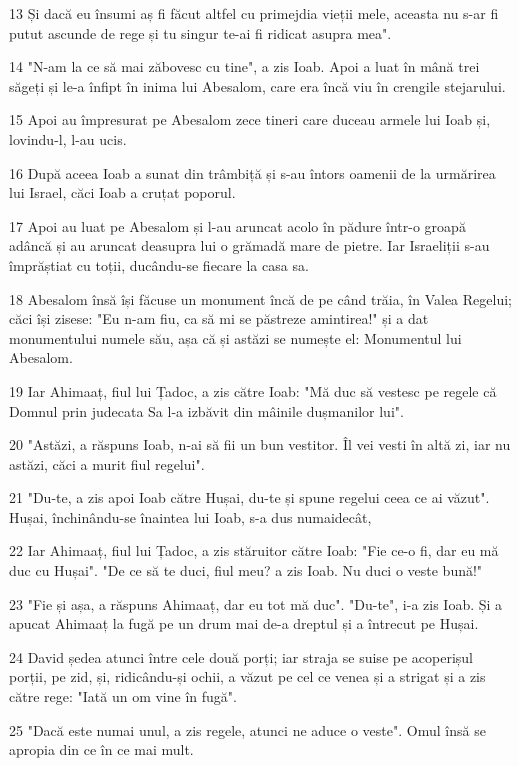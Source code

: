 \par 13 Și dacă eu însumi aș fi făcut altfel cu primejdia vieții mele, aceasta nu s-ar fi putut ascunde de rege și tu singur te-ai fi ridicat asupra mea".
\par 14 "N-am la ce să mai zăbovesc cu tine", a zis Ioab. Apoi a luat în mână trei săgeți și le-a înfipt în inima lui Abesalom, care era încă viu în crengile stejarului.
\par 15 Apoi au împresurat pe Abesalom zece tineri care duceau armele lui Ioab și, lovindu-l, l-au ucis.
\par 16 După aceea Ioab a sunat din trâmbiță și s-au întors oamenii de la urmărirea lui Israel, căci Ioab a cruțat poporul.
\par 17 Apoi au luat pe Abesalom și l-au aruncat acolo în pădure într-o groapă adâncă și au aruncat deasupra lui o grămadă mare de pietre. Iar Israeliții s-au împrăștiat cu toții, ducându-se fiecare la casa sa.
\par 18 Abesalom însă își făcuse un monument încă de pe când trăia, în Valea Regelui; căci își zisese: "Eu n-am fiu, ca să mi se păstreze amintirea!" și a dat monumentului numele său, așa că și astăzi se numește el: Monumentul lui Abesalom.
\par 19 Iar Ahimaaț, fiul lui Țadoc, a zis către Ioab: "Mă duc să vestesc pe regele că Domnul prin judecata Sa l-a izbăvit din mâinile dușmanilor lui".
\par 20 "Astăzi, a răspuns Ioab, n-ai să fii un bun vestitor. Îl vei vesti în altă zi, iar nu astăzi, căci a murit fiul regelui".
\par 21 "Du-te, a zis apoi Ioab către Hușai, du-te și spune regelui ceea ce ai văzut". Hușai, închinându-se înaintea lui Ioab, s-a dus numaidecât,
\par 22 Iar Ahimaaț, fiul lui Țadoc, a zis stăruitor către Ioab: "Fie ce-o fi, dar eu mă duc cu Hușai". "De ce să te duci, fiul meu? a zis Ioab. Nu duci o veste bună!"
\par 23 "Fie și așa, a răspuns Ahimaaț, dar eu tot mă duc". "Du-te", i-a zis Ioab. Și a apucat Ahimaaț la fugă pe un drum mai de-a dreptul și a întrecut pe Hușai.
\par 24 David ședea atunci între cele două porți; iar straja se suise pe acoperișul porții, pe zid, și, ridicându-și ochii, a văzut pe cel ce venea și a strigat și a zis către rege: "Iată un om vine în fugă".
\par 25 "Dacă este numai unul, a zis regele, atunci ne aduce o veste". Omul însă se apropia din ce în ce mai mult.
